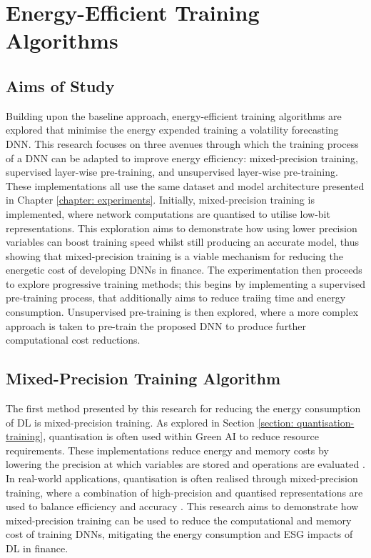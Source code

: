 \documentclass[a4paper, 11pt]{report}
\begin{document}
    \chapter{Energy-Efficient Training Algorithms}
    \label{chapter: energy-extensions}

    \section{Aims of Study}

    Building upon the baseline approach, energy-efficient training algorithms are explored that minimise the energy expended training a volatility forecasting DNN. This research focuses on three avenues through which the training process of a DNN can be adapted to improve energy efficiency: mixed-precision training, supervised layer-wise pre-training, and unsupervised layer-wise pre-training. These implementations all use the same dataset and model architecture presented in Chapter \ref{chapter: experiments}. Initially, mixed-precision training is implemented, where network computations are quantised to utilise low-bit representations. This exploration aims to demonstrate how using lower precision variables can boost training speed whilst still producing an accurate model, thus showing that mixed-precision training is a viable mechanism for reducing the energetic cost of developing DNNs in finance. The experimentation then proceeds to explore progressive training methods; this begins by implementing a supervised pre-training process, that additionally aims to reduce traiing time and energy consumption. Unsupervised pre-training is then explored, where a more complex approach is taken to pre-train the proposed DNN to produce further computational cost reductions.


    \section{Mixed-Precision Training Algorithm}
    \label{section: mixed-precision-method}

    The first method presented by this research for reducing the energy consumption of DL is mixed-precision training. As explored in Section \ref{section: quantisation-training}, quantisation is often used within Green AI to reduce resource requirements. These implementations reduce energy and memory costs by lowering the precision at which variables are stored and operations are evaluated \citep{fan-2020b}. In real-world applications, quantisation is often realised through mixed-precision training, where a combination of high-precision and quantised representations are used to balance efficiency and accuracy \citep{ott-2017}. This research aims to demonstrate how mixed-precision training can be used to reduce the computational and memory cost of training DNNs, mitigating the energy consumption and ESG impacts of DL in finance.
\end{document}
